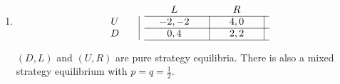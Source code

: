 \documentclass[12pt]{article}
\newcounter{question}[section]
\newenvironment{subquestions}{
  \begin{enumerate}[label=(\roman*)]}{\end{enumerate}}
\begin{document}
\begin{subquestions}
  \item
  \setlength{\arraycolsep}{0pt}
  \[
  \begin{array}{cccccc}
  &  & \quad L \quad & & \quad R \quad  &  \\
  \cline{3-6} U \quad & \vline{} & \quad -2,-2  \quad & \vline{} & \quad 4,0 \quad & \vline{}  \\
  \cline{3-6} D \quad & \vline{} & \quad 0,4 \quad & \vline{} & \quad 2,2 \quad & \vline{} \\
  \cline{3-6}
  \end{array}
  \]

  \textcolor{solution-color}{
    $(D,L)$ and $(U,R)$ are pure strategy equilibria. There is also a mixed
    strategy equilibrium with $p=q=\frac{1}{2}$.
}
\end{subquestions}
\end{document}
